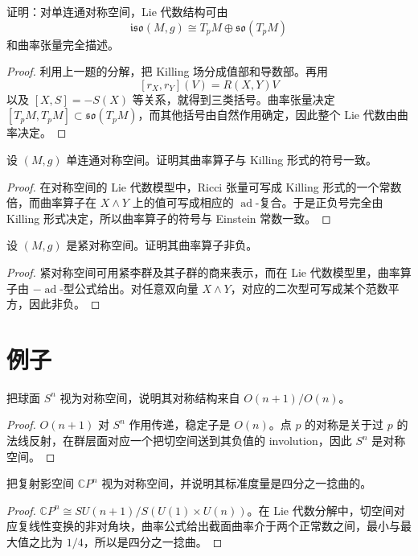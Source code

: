 \documentclass[11pt,a4paper,openany]{ctexbook}
\numberwithin{equation}{chapter}
\begin{document}
\begin{problem}
证明：对单连通对称空间，Lie 代数结构可由
\[
\mathfrak{iso}(M,g)\cong T_pM\oplus \mathfrak{so}(T_pM)
\]
和曲率张量完全描述。
\end{problem}
\begin{proof}
利用上一题的分解，把 Killing 场分成值部和导数部。再用
\[
[r_X,r_Y](V)=R(X,Y)V
\]
以及 \([X,S]= -S(X)\) 等关系，就得到三类括号。曲率张量决定 \( [T_pM,T_pM]\subset \mathfrak{so}(T_pM)\)，而其他括号由自然作用确定，因此整个 Lie 代数由曲率决定。
\end{proof}

\begin{problem}
设 \((M,g)\) 单连通对称空间。证明其曲率算子与 Killing 形式的符号一致。
\end{problem}
\begin{proof}
在对称空间的 Lie 代数模型中，Ricci 张量可写成 Killing 形式的一个常数倍，而曲率算子在 \(X\wedge Y\) 上的值可写成相应的 \(\operatorname{ad}\)-复合。于是正负号完全由 Killing 形式决定，所以曲率算子的符号与 Einstein 常数一致。
\end{proof}

\begin{problem}
设 \((M,g)\) 是紧对称空间。证明其曲率算子非负。
\end{problem}
\begin{proof}
紧对称空间可用紧李群及其子群的商来表示，而在 Lie 代数模型里，曲率算子由 \(-\operatorname{ad}\)-型公式给出。对任意双向量 \(X\wedge Y\)，对应的二次型可写成某个范数平方，因此非负。
\end{proof}

\section{例子}

\begin{problem}
把球面 \(S^n\) 视为对称空间，说明其对称结构来自 \(O(n+1)/O(n)\)。
\end{problem}
\begin{proof}
\(O(n+1)\) 对 \(S^n\) 作用传递，稳定子是 \(O(n)\)。点 \(p\) 的对称是关于过 \(p\) 的法线反射，在群层面对应一个把切空间送到其负值的 involution，因此 \(S^n\) 是对称空间。
\end{proof}

\begin{problem}
把复射影空间 \(\mathbb CP^n\) 视为对称空间，并说明其标准度量是四分之一捻曲的。
\end{problem}
\begin{proof}
\(\mathbb CP^n\cong SU(n+1)/S(U(1)\times U(n))\)。在 Lie 代数分解中，切空间对应复线性变换的非对角块，曲率公式给出截面曲率介于两个正常数之间，最小与最大值之比为 \(1/4\)，所以是四分之一捻曲。
\end{proof}
\end{document}
